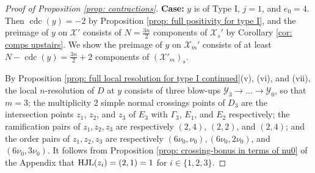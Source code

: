 \documentclass[12pt]{amsart}
\numberwithin{equation}{section}
\theoremstyle{definition}
\newcommand{\X}{\mathcal{X}}
\newcommand{\Y}{\mathcal{Y}}
\newcommand{\tx}[1]{\text{#1}}
\let\L\relax
\DeclareMathOperator{\cdc}{cdc}
\DeclareMathOperator{\HJL}{HJL}
\DeclareMathOperator{\L}{L}
\begin{document}
\begin{proof}[Proof of Proposition \ref{prop: contractions}]
    
    \textbf{Case:} $y$ is of Type I, $j=1$, and $e_0=4$. Then $\cdc(y)=-2$ by Proposition \ref{prop: full positivity for type I}, and the preimage of $y$ on $\X'$ consists of $N=\frac{3n}{2}$ components of $\X_s'$ by Corollary \ref{cor: comps upstairs}. We show the preimage of $y$ on $\X_m'$ consists of at least $N-\cdc(y)=\frac{3n}{2}+2$ components of $(\X'_m)_s$.

    By Proposition \ref{prop: full local resolution for type I continued}(v), (vi), and (vii), the local $n$-resolution of $D$ at $y$ consists of three blow-ups $\Y_3\to...\to\Y_0$, so that $m=3$; the multiplicity $2$ simple normal crossings points of $D_3$ are the intersection points $z_1$, $z_2$, and $z_3$ of $E_3$ with $\Gamma_3$, $E_1$, and $E_2$ respectively; the ramification pairs of $z_1,z_2,z_3$ are respectively $(2,4)$, $(2,2)$, and $(2,4)$; and the order pairs of $z_1,z_2,z_3$ are respectively $(6\nu_0,\nu_0),(6\nu_0,2\nu_0)$, and $(6\nu_0,3\nu_0)$. It follows from Proposition \ref{prop: crossing-bonus in terms of nu0} of the Appendix that $\HJL(z_i)=\L(2,1)=1$ for $i\in\{1,2,3\}$.


\end{proof}
\end{document}

